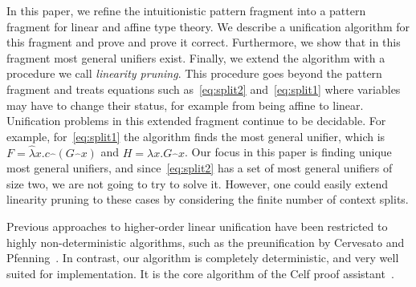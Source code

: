 \documentclass{eptcs}
\newcommand{\lhat}[1]{\widehat{\;#1\;}}
\theoremstyle{definition}
\begin{document}
In this paper, we refine the intuitionistic pattern fragment into a
pattern fragment for linear and affine type theory.
We describe a unification algorithm for this fragment 
and prove and prove it correct. Furthermore, we show that in this fragment most general unifiers
exist. Finally, we extend the algorithm with a procedure we call
\emph{linearity pruning}.  This procedure goes beyond the pattern
fragment and treats equations such as~\eqref{eq:split2}
and~\eqref{eq:split1} where variables may have to change their status,
for example from being affine to linear.  Unification problems in this
extended fragment continue to be decidable.  For example,
for~\eqref{eq:split1} the algorithm finds the most general unifier, which is $F=
\widehat{\lambda} x.c \lhat{} (G\lhat{}x)$ and $H= \lambda x.G\lhat{}x$.
Our focus in this paper is finding unique most general unifiers, and
since~\eqref{eq:split2} has a set of most general unifiers of size two,
we are not going to try to solve it.  However, one could easily extend
linearity pruning to these cases by considering the finite number of context
splits.

Previous approaches to higher-order linear unification have been
restricted to highly non-deterministic algorithms, such as the
preunification by Cervesato and
Pfenning~\cite{Cervesato97linearhigher-order}.  In contrast, our
algorithm is completely deterministic, and very well suited for
implementation.  It is the core algorithm of the Celf proof
assistant~\cite{SchackNielsen08ijcar}.
\end{document}
